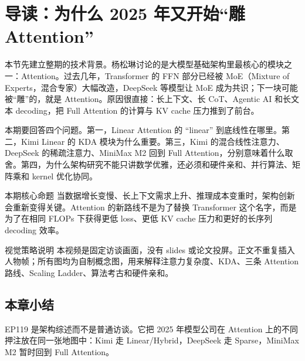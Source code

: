 \section{导读：为什么 2025 年又开始“雕 Attention”}

本节先建立整期的技术背景。杨松琳讨论的是大模型基础架构里最核心的模块之一：Attention。过去几年，Transformer 的 FFN 部分已经被 MoE（Mixture of Experts，混合专家）大幅改造，DeepSeek 等模型让 MoE 成为共识；下一块可能被“雕”的，就是 Attention。原因很直接：长上下文、长 CoT、Agentic AI 和长文本 decoding，把 Full Attention 的计算与 KV cache 压力推到了前台。

本期要回答四个问题。第一，Linear Attention 的 “linear” 到底线性在哪里。第二，Kimi Linear 的 KDA 模块为什么重要。第三，Kimi 的混合线性注意力、DeepSeek 的稀疏注意力、MiniMax M2 回到 Full Attention，分别意味着什么取舍。第四，为什么架构研究不能只讲数学优雅，还必须和硬件亲和、并行算法、矩阵乘和 kernel 优化协同。

\begin{importantbox}{本期核心命题}
当数据增长变慢、长上下文需求上升、推理成本变重时，架构创新会重新变得关键。Attention 的新路线不是为了替换 Transformer 这个名字，而是为了在相同 FLOPs 下获得更低 loss、更低 KV cache 压力和更好的长序列 decoding 效率。
\end{importantbox}

\begin{knowledgebox}{视觉策略说明}
本视频是固定访谈画面，没有 slides 或论文投屏。正文不重复插入人物帧；所有图均为自制概念图，用来解释注意力复杂度、KDA、三条 Attention 路线、Scaling Ladder、算法考古和硬件亲和。
\end{knowledgebox}

\subsection{本章小结}

EP119 是架构综述而不是普通访谈。它把 2025 年模型公司在 Attention 上的不同押注放在同一张地图中：Kimi 走 Linear/Hybrid，DeepSeek 走 Sparse，MiniMax M2 暂时回到 Full Attention。

